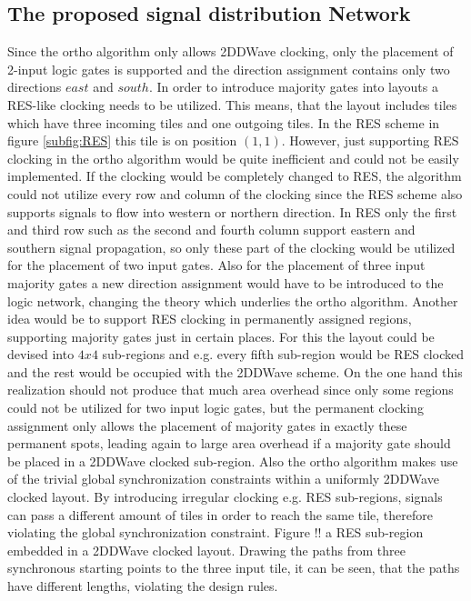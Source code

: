 \subsection{The proposed signal distribution Network}
Since the ortho algorithm only allows 2DDWave clocking, only the placement of 2-input logic gates is supported and the direction assignment contains only two directions $east$ and $south$. In order to introduce majority gates into layouts a RES-like clocking needs to be utilized. This means, that the layout includes tiles which have three incoming tiles and one outgoing tiles. In the RES scheme in figure \ref{subfig:RES} this tile is on position $(1, 1)$. However, just supporting RES clocking in the ortho algorithm would be quite inefficient and could not be easily implemented. If the clocking would be completely changed to RES, the algorithm could not utilize every row and column of the clocking since the RES scheme also supports signals to flow into western or northern direction. In RES only the first and third row such as the second and fourth column support eastern and southern signal propagation, so only these part of the clocking would be utilized for the placement of two input gates. Also for the placement of three input majority gates a new direction assignment would have to be introduced to the logic network, changing the theory which underlies the ortho algorithm. Another idea would be to support RES clocking in permanently assigned regions, supporting majority gates just in certain places. For this the layout could be devised into $4x4$ sub-regions and e.g. every fifth sub-region would be RES clocked and the rest would be occupied with the 2DDWave scheme. On the one hand this realization should not produce that much area overhead since only some regions could not be utilized for two input logic gates, but the permanent clocking assignment only allows the placement of majority gates in exactly these permanent spots, leading again to large area overhead if a majority gate should be placed in a 2DDWave clocked sub-region. Also the ortho algorithm makes use of the trivial global synchronization constraints within a uniformly 2DDWave clocked layout. By introducing irregular clocking e.g. RES sub-regions, signals can pass a different amount of tiles in order to reach the same tile, therefore violating the global synchronization constraint. Figure !! a RES sub-region embedded in a 2DDWave clocked layout. Drawing the paths from three synchronous starting points to the three input tile, it can be seen, that the paths have different lengths, violating the design rules.


